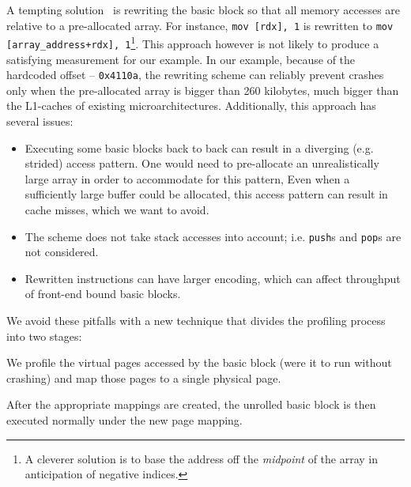 A tempting solution~\cite{ithemal} is rewriting
the basic block so that all memory accesses are
relative to a pre-allocated array.
For instance, \verb|mov [rdx], 1| is rewritten to
\verb|mov [array_address+rdx], 1|\footnote{
A cleverer solution is to
base the address off the \textit{midpoint} of the array
in anticipation of negative indices.
}. 
This approach however is not likely to produce a satisfying measurement
for our example.
In our example,
because of the hardcoded offset -- \verb|0x4110a|,
the rewriting scheme can reliably prevent crashes only when the pre-allocated array
is bigger than 260 kilobytes, much bigger than the L1-caches of existing microarchitectures.
Additionally, this approach has several issues:
\begin{itemize}
    \item Executing some basic blocks back to back can result in a 
    diverging (e.g. strided) access pattern. 
    One would need to pre-allocate an unrealistically large array
    in order to  accommodate for this pattern, 
    Even when a sufficiently large buffer could be allocated,
    this access pattern can result in cache misses, 
    which we want to avoid.
    \item The scheme does not take stack accesses into account; i.e. \verb|push|s and \verb|pop|s
    are not considered.
    \item Rewritten instructions can
    have larger encoding, which can affect throughput
    of front-end bound basic blocks.
\end{itemize}

We avoid these pitfalls with a new technique
that divides the profiling process into two stages:
\begin{enumerate*}
\item We profile the virtual pages accessed by
the basic block (were it to run without crashing)
and map those pages to a single physical page.
\item After the appropriate mappings are created,
the unrolled basic block is then executed normally under
the new page mapping.
\end{enumerate*}

